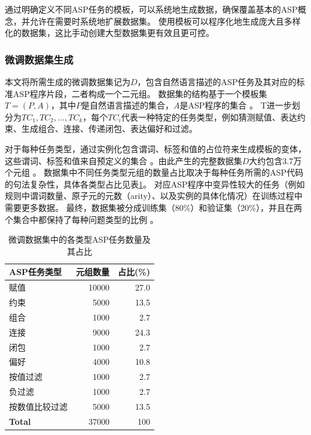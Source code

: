 通过明确定义不同ASP任务的模板，可以系统地生成数据，确保覆盖基本的ASP概念，并允许在需要时系统地扩展数据集。
使用模板可以程序化地生成庞大且多样化的数据集，这比手动创建大型数据集更有效且更可控。

\subsubsection{微调数据集生成}
本文将所需生成的微调数据集记为$D$，包含自然语言描述的ASP任务及其对应的标准ASP程序片段，二者构成一个二元组。
数据集的结构基于一个模板集$T = (P, A)$，其中$P$是自然语言描述的集合，$A$是ASP程序的集合 。
T进一步划分为${TC_1, TC_2,..., TC_k}$，每个$TC_i$代表一种特定的任务类型，例如猜测赋值、表达约束、生成组合、连接、传递闭包、表达偏好和过滤。

对于每种任务类型，通过实例化包含谓词、标签和值的占位符来生成模板的变体，这些谓词、标签和值来自预定义的集合 。由此产生的完整数据集$D$大约包含3.7万个元组 。
数据集中不同任务类型元组的数量占比取决于每种任务所需的ASP代码的句法复杂性，具体各类型占比见表\ref{tab:task-portion}。
对应ASP程序中变异性较大的任务（例如规则中谓词数量、原子元的元数（arity）、以及实例的具体化情况）在训练过程中需要更多数据。
最终，数据集被分成训练集（80\%）和验证集（20\%），并且在两个集合中都保持了每种问题类型的比例 。

\begin{table}[ht]
\centering
\begin{tabular}{lrr}
\toprule
\textbf{ASP任务类型} & \textbf{元组数量} & \textbf{占比(\%)} \\
\midrule
赋值          & 10000 & 27.0 \\
约束          &   5000 & 13.5 \\
组合         &   1000 & 2.7 \\
连接                &   9000 & 24.3 \\
闭包  &   1000 & 2.7 \\
偏好          &   4000 & 10.8 \\
按值过滤     &   1000 & 2.7 \\
负过滤  &   1000 & 2.7 \\
按数值比较过滤   &   5000 & 13.5 \\
\midrule
\textbf{Total}      & 37000 & 100 \\
\bottomrule
\end{tabular}
\caption{微调数据集中的各类型ASP任务数量及其占比}
\label{tab:task-portion}
\end{table}

